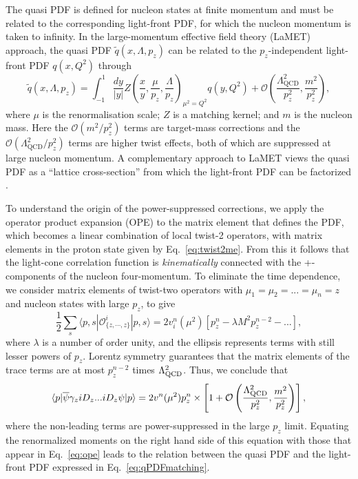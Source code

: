 The quasi PDF is defined for nucleon states at finite momentum and must be related to the corresponding light-front PDF, for which the nucleon momentum is taken to infinity.
In the  large-momentum  effective field theory (LaMET) approach, the quasi PDF $\widetilde{q}(x,\Lambda,p_z)$ can be related to the $p_z$-independent
light-front PDF $q(x,Q^2)$ through~\cite{Ji:2013dva,Ji:2014gla}
\begin{equation} \label{eq:qPDFmatching}
\widetilde{q}(x,\Lambda ,p_z) = 
  \int_{-1}^1 \frac{dy}{\left\vert y\right\vert} 
    Z\left( \frac{x}{y}, \frac{\mu}{p_z}, \frac{\Lambda}{p_z}\right)_{\mu^2 = Q^2} q(y,Q^2) +
  \mathcal{O}\left( \frac{\Lambda_\text{QCD}^2}{p_z^2},\frac{m^2}{p_z^2}\right), 
\end{equation}
where $\mu$ is the renormalisation scale;
$Z$ is a matching kernel; and $m$ is the nucleon mass.
Here the $\mathcal{O}\left(m^2/p_z^2\right)$ terms are target-mass corrections and the $ \mathcal{O}\left(\Lambda_\text{QCD}^2/p_z^2\right)$ terms are higher twist effects, both of which are suppressed at large nucleon momentum. A complementary approach to LaMET views the quasi PDF as a ``lattice cross-section'' from which the light-front PDF can be factorized \cite{Ma:2014jla, Ma:2014jga}. 

To understand the origin of the power-suppressed corrections, we apply the operator product expansion (OPE) to the matrix element that defines the PDF, which becomes a linear combination of local twist-2 operators, with matrix elements in the proton state given by Eq.~\eqref{eq:twist2me}. From this it follows that the light-cone correlation function is {\it kinematically} connected with the +-components of the nucleon four-momentum. To eliminate the time dependence, we consider matrix elements of twist-two operators with $\mu_1=\mu_2=...=\mu_n=z$ and nucleon states with large $p_z$, to give
\begin{equation}
\frac{1}{2} \sum_s \langle p,s|\mathcal{O}^i_{\{z,\cdots,z\}}|p,s\rangle = 2v_i^n(\mu^2)\left[p_z^n-\lambda M^2 p_z^{n-2}-...\right], 
\end{equation}
where $\lambda$ is a number of order unity, and the ellipsis represents terms
with still lesser powers of $p_z$. Lorentz symmetry guarantees that the matrix elements of the trace terms are at most
$p_z^{n-2}$ times $\Lambda^2_{\rm QCD}$. Thus, we conclude that
\begin{equation}
      \langle p| {\overline \psi}\gamma_ziD_z ... iD_z \psi|p\rangle
       = 2v^n(\mu^2) p_z^n\times \left[ 1 + {\cal O}\left(\frac{\Lambda^2_{\rm QCD}}{p_z^2},  \frac{m^2}{p_z^2}\right)\right],
\end{equation}
where the non-leading terms are power-suppressed in the large $p_z$ limit. Equating the renormalized moments on the right hand side of this equation with those that appear in Eq.~\eqref{eq:ope} leads to the relation between the quasi PDF and the light-front PDF expressed in Eq.~\eqref{eq:qPDFmatching}.

